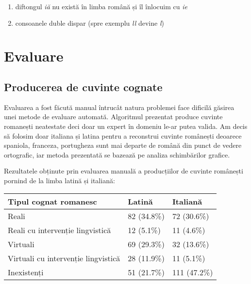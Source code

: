 \begin{enumerate}
  \item diftongul \textit{iă} nu există în limba română și îl înlocuim cu \textit{ie}
  \item consoanele duble dispar (spre exemplu \textit{ll} devine \textit{l})
\end{enumerate}

\section{Evaluare}

\subsection{Producerea de cuvinte cognate}
Evaluarea a fost făcută manual întrucât natura problemei face dificilă găsirea unei metode de evaluare
automată. Algoritmul prezentat produce cuvinte romanești neatestate deci doar un expert în domeniu
le-ar putea valida. Am decis să folosim doar italiana și latina pentru a reconstrui cuvinte românești
deoarece spaniola, franceza, portugheza sunt mai departe de română din punct de vedere ortografic,
iar metoda prezentată se bazează pe analiza schimbărilor grafice.

Rezultatele obținute prin evaluarea manuală a producțiilor de cuvinte românești pornind de la limba
latină și italiană:
\begin{center}
  \begin{tabular}{|| l l l ||}
    \hline
    Tipul cognat romanesc & Latină & Italiană \\[0.5ex]
    \hline
    \hline
    Reali                                & 82 (34.8\%)  & 72 (30.6\%) \\
    \hline
    Reali cu intervenție lingvistică     & 12 (5.1\%)   & 11 (4.6\%) \\
    \hline
    Virtuali                             & 69 (29.3\%)  & 32 (13.6\%) \\
    \hline
    Virtuali cu intervenție lingvistică  & 28 (11.9\%)  & 11 (5.1\%) \\
    \hline
    Inexistenți                          & 51 (21.7\%)  & 111 (47.2\%) \\
    \hline
  \end{tabular}
\end{center}

